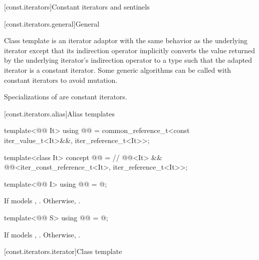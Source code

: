 [const.iterators]{Constant iterators and sentinels}

[const.iterators.general]{General}

\pnum
Class template  is an iterator adaptor
with the same behavior as the underlying iterator
except that its indirection operator implicitly converts
the value returned by the underlying iterator's indirection operator
to a type such that the adapted iterator is
a constant iterator.
Some generic algorithms can be called with constant iterators to avoid mutation.

\pnum
Specializations of  are constant iterators.

[const.iterators.alias]{Alias templates}

\begin{itemdecl}
template<@@ It>
  using @@ =
    common_reference_t<const iter_value_t<It>&&, iter_reference_t<It>>;

template<class It>
  concept @@ =                                                   // \expos
    @@<It> && @@<iter_const_reference_t<It>, iter_reference_t<It>>;

template<@@ I>
  using @@ = @\seebelow@;
\end{itemdecl}

\begin{itemdescr}
\pnum
\result
If  models , .
Otherwise, .
\end{itemdescr}

\begin{itemdecl}
template<@@ S>
  using @@ = @\seebelow@;
\end{itemdecl}

\begin{itemdescr}
\pnum
\result
If  models , .
Otherwise, .
\end{itemdescr}

[const.iterators.iterator]{Class template }

